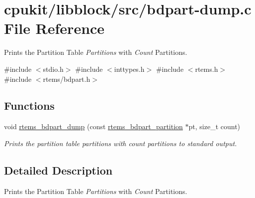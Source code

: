 \hypertarget{bdpart-dump_8c}{}\section{cpukit/libblock/src/bdpart-\/dump.c File Reference}
\label{bdpart-dump_8c}


Prints the Partition Table {\itshape Partitions} with {\itshape Count} Partitions.  


{\ttfamily \#include $<$stdio.\+h$>$}\newline
{\ttfamily \#include $<$inttypes.\+h$>$}\newline
{\ttfamily \#include $<$rtems.\+h$>$}\newline
{\ttfamily \#include $<$rtems/bdpart.\+h$>$}\newline
\subsection*{Functions}
\begin{DoxyCompactItemize}
\item 
void \mbox{\hyperlink{group__rtems__bdpart_gabd436124677aaeaaf2ae4c9f2bb031d2}{rtems\+\_\+bdpart\+\_\+dump}} (const \mbox{\hyperlink{structrtems__bdpart__partition}{rtems\+\_\+bdpart\+\_\+partition}} $\ast$pt, size\+\_\+t count)
\begin{DoxyCompactList}\small\item\em Prints the partition table {\itshape partitions} with {\itshape count} partitions to standard output. \end{DoxyCompactList}\end{DoxyCompactItemize}


\subsection{Detailed Description}
Prints the Partition Table {\itshape Partitions} with {\itshape Count} Partitions. 

